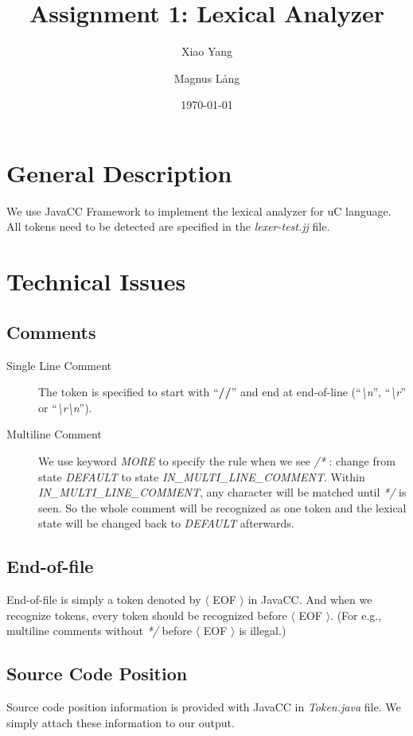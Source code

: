 \documentclass[a4paper,11pt]{article}
\title{Assignment 1: Lexical Analyzer}
\author{Xiao Yang \and Magnus L{\aa}ng} %
\date{\today}
\newcommand{\token}[1]{$ \langle $ #1 $ \rangle $}
\begin{document}
\maketitle
\section{General Description}
	We use JavaCC Framework to implement the lexical analyzer for uC language.
	All tokens need to be detected are specified in the \textit{lexer-test.jj} file.

\section{Technical Issues}
\subsection{Comments}
\begin{description}
	\item[Single Line Comment] The token is specified to start with ``\textbf{//}'' and end at end-of-line (``\textit{\textbackslash n}'', ``\textit{\textbackslash r}'' or ``\textit{\textbackslash r\textbackslash n}'').
	\item[Multiline Comment] We use keyword \emph{MORE} to specify the rule when we see \textit{/*} : change from state \emph{DEFAULT} to state \emph{IN\_MULTI\_LINE\_COMMENT}. Within \emph{IN\_MULTI\_LINE\_COMMENT}, any character will be matched until \textit{*/} is seen. So the whole comment will be recognized as one token and the lexical state will be changed back to \emph{DEFAULT} afterwards.

\end{description}
\subsection{End-of-file}
	End-of-file is simply a token denoted by \token{EOF} in JavaCC. And when we recognize tokens, every token should be recognized before \token{EOF}. (For e.g., multiline comments without \textit{*/} before \token{EOF} is illegal.)
\subsection{Source Code Position}
	Source code position information is provided with JavaCC in \textit{Token.java} file. We simply attach these information to our output.
\end{document}
